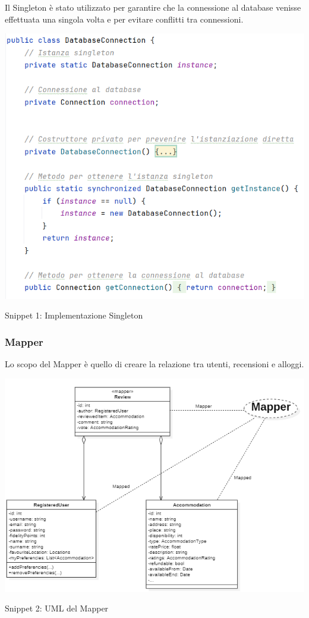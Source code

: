 \documentclass[10pt]{article}
\begin{document}
Il Singleton è stato utilizzato per garantire che la connessione al database venisse effettuata una singola volta e per evitare conflitti tra connessioni.
\vspace{-0.3cm}
\begin{center}
\includegraphics[scale=0.45]{Snippets/Singleton}
\par\medskip
Snippet 1: Implementazione Singleton
\par\medskip
\end{center}

\subsubsection{Mapper}

Lo scopo del Mapper è quello di creare la relazione tra utenti, recensioni e alloggi.

\begin{center}
\includegraphics[scale=0.85]{Snippets/Mapper}
\par\medskip
Snippet 2: UML del Mapper
\par\medskip
\end{center}
\end{document}
